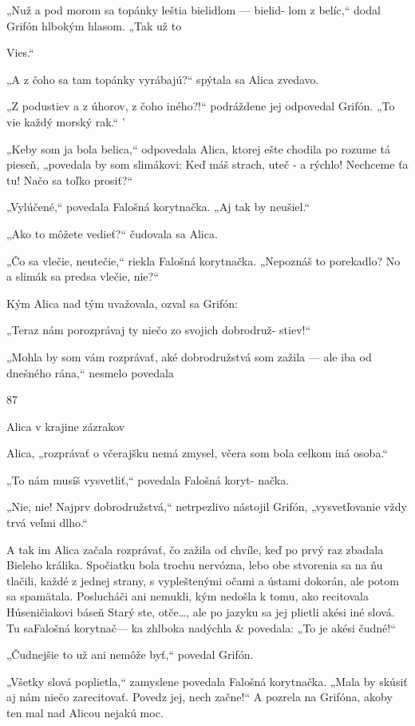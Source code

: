 \documentclass[12pt]{article}
\begin{document}
\begin{Parallel}[p]{}{}
{{„Nuž a pod morom sa topánky leštia bielidlom — bielid-
lom z belíc,“ dodal Grifón hlbokým hlasom. „Tak už to

Vies.“

„A z čoho sa tam topánky vyrábajú?“ spýtala sa Alica
zvedavo.

„Z podustiev a z úhorov, z čoho iného?!“ podráždene
jej odpovedal Grifón. „To vie každý morský rak.“ '

„Keby som ja bola belica,“ odpovedala Alica, ktorej ešte
chodila po rozume tá pieseň, „povedala by som slimákovi:
Keď máš strach, uteč - a rýchlo! Nechceme ťa tu! Načo sa
toľko prosiť?“

„Vylúčené,“ povedala Falošná korytnačka. „Aj tak by
neušiel.“

„Ako to môžete vedieť?“ čudovala sa Alica.

„Čo sa vlečie, neutečie,“ riekla Falošná korytnačka.
„Nepoznáš to porekadlo? No a slimák sa predsa vlečie,
nie?“

Kým Alica nad tým uvažovala, ozval sa Grifón:

„Teraz nám porozprávaj ty niečo zo svojich dobrodruž-
stiev!“

„Mohla by som vám rozprávať, aké dobrodružstvá som
zažila — ale iba od dnešného rána,“ nesmelo povedala

87

Alica v krajine zázrakov

Alica, „rozprávať o včerajšku nemá zmysel, včera som bola
celkom iná osoba.“

„To nám musíš vysvetliť,“ povedala Falošná koryt-
načka.

„Nie, nie! Najprv dobrodružstvá,“ netrpezlivo nástojil
Grifón, „vysvetľovanie vždy trvá veľmi dlho.“

A tak im Alica začala rozprávať, čo zažila od chvíle, keď
po prvý raz zbadala Bieleho králika. Spočiatku bola trochu
nervózna, lebo obe stvorenia sa na ňu tlačili, každé z jednej
strany, s vypleštenými očami a ústami dokorán, ale potom
sa spamätala. Poslucháči ani nemukli, kým nedošla k tomu,
ako recitovala Húseničiakovi báseň Starý ste, otče…, ale
po jazyku sa jej plietli akési iné slová. Tu saFalošná korytnač—
ka zhlboka nadýchla & povedala: „To je akési čudné!“

„Čudnejšie to už ani nemôže byť,“ povedal Grifón.

„Všetky slová poplietla,“ zamyslene povedala Falošná
korytnačka. „Mala by skúsiť aj nám niečo zarecitovať.
Povedz jej, nech začne!“ A pozrela na Grifóna, akoby ten
mal nad Alicou nejakú moc.

}}
\end{Parallel}
\end{document}
